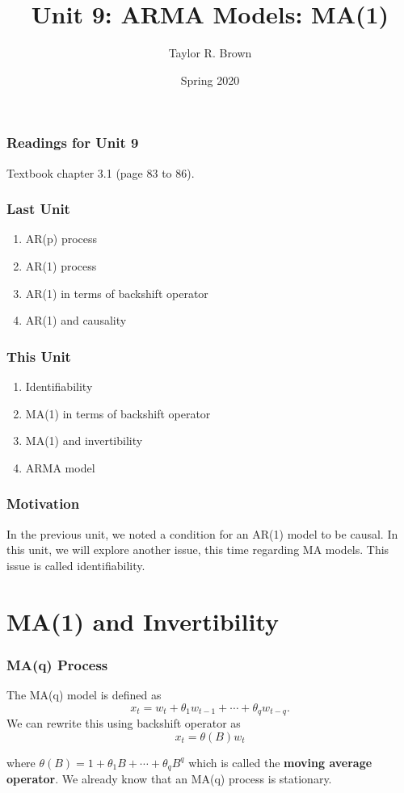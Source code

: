 \documentclass[%
xcolor=pdftex]{beamer}
\title{Unit 9: ARMA Models: MA(1)}
\author[STAT 5170: Applied Time Series, Unit 9]{Taylor R. Brown}
\institute{Department of Statistics, University of Virginia}
\date{Spring 2020}
\begin{document}
\frame{\titlepage}


\begin{frame}
\frametitle{Readings for Unit 9}

Textbook chapter 3.1 (page 83 to 86).

\end{frame}


\begin{frame}
\frametitle{Last Unit}

\begin{enumerate}
\item AR(p) process
\item AR(1) process
\item AR(1) in terms of backshift operator
\item AR(1) and causality
\end{enumerate}

\end{frame}

\begin{frame}
\frametitle{This Unit}
\begin{enumerate}
\item Identifiability
\item MA(1) in terms of backshift operator
\item MA(1) and invertibility
\item ARMA model
\end{enumerate}
\end{frame}

\begin{frame}
\frametitle{Motivation}

In the previous unit, we noted a condition for an AR(1) model to be causal. In this unit, we will explore another issue, this time regarding MA models. This issue is called identifiability.

\end{frame}

\section{MA(1) and Invertibility}
\frame{\tableofcontents[currentsection]}

\begin{frame}
\frametitle{MA(q) Process}

The MA(q) model is defined as
$$
x_t=w_t + \theta_1 w_{t-1}+ \cdots + \theta_q w_{t-q}.
$$
We can rewrite this using backshift operator as
\begin{equation} \label{eq:MA}
x_t=\theta(B) w_t
\end{equation}

 where $\theta(B)=1+\theta_1 B+ \cdots +\theta_q B^q$ which is called the \textbf{moving average operator}. We already know that an MA(q) process is stationary.

\end{frame}
\end{document}
